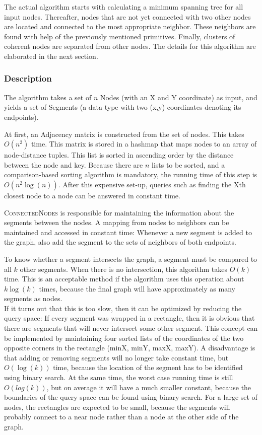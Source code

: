 \documentclass[11pt]{article}
\begin{document}
The actual algorithm starts with calculating a minimum spanning tree for all input nodes. Thereafter, nodes that are not yet connected with two other nodes are located and connected to the most appropriate neighbor. These neighbors are found with help of the previously mentioned primitives. Finally, clusters of coherent nodes are separated from other nodes. The details for this algorithm are elaborated in the next section.

\subsubsection{Description}
The algorithm takes a set of $n$ Nodes (with an X and Y coordinate) as input, and yields a set of Segments (a data type with two (x,y) coordinates denoting its endpoints).

At first, an Adjacency matrix is constructed from the set of nodes. This takes $O(n^2)$ time. This matrix is stored in a hashmap that maps nodes to an array of node-distance tuples. This list is sorted in ascending order by the distance between the node and key. Because there are $n$ lists to be sorted, and a comparison-based sorting algorithm is mandatory, the running time of this step is $O(n^2 \log(n))$. After this expensive set-up, queries such as finding the Xth closest node to a node can be answered in constant time.

\textsc{ConnectedNodes} is responsible for maintaining the information about the segments between the nodes. A mapping from nodes to neighbors can be maintained and accessed in constant time: Whenever a new segment is added to the graph, also add the segment to the sets of neighbors of both endpoints.

To know whether a segment intersects the graph, a segment must be compared to all $k$ other segments. When there is no intersection, this algorithm takes $O(k)$ time. This is an acceptable method if the algorithm uses this operation about $k \log(k)$ times, because the final graph will have approximately as many segments as nodes.\\
If it turns out that this is too slow, then it can be optimized by reducing the query space: If every segment was wrapped in a rectangle, then it is obvious that there are segments that will never intersect some other segment. This concept can be implemented by maintaining four sorted lists of the coordinates of the two opposite corners in the rectangle (minX, minY, maxX, maxY). A disadvantage is that adding or removing segments will no longer take constant time, but $O(\log(k))$ time, because the location of the segment has to be identified using binary search. At the same time, the worst case running time is still $O(log(k))$, but on average it will have a much smaller constant, because the boundaries of the query space can be found using binary search. For a large set of nodes, the rectangles are expected to be small, because the segments will probably connect to a near node rather than a node at the other side of the graph.
\end{document}
